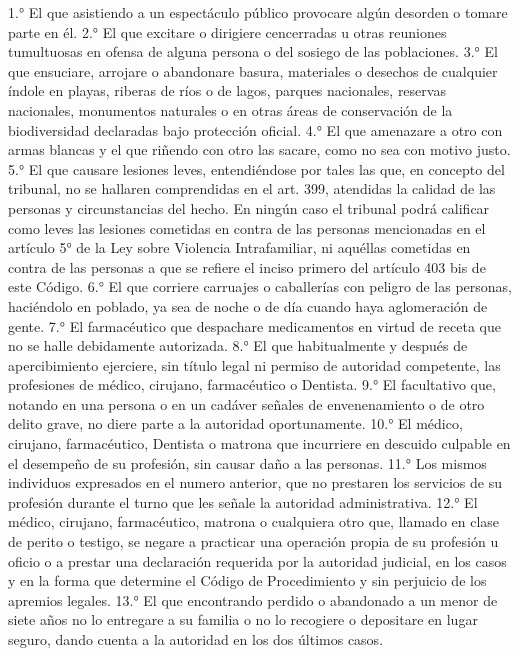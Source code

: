     1.° El que asistiendo a un espectáculo público provocare algún desorden o tomare parte en él.
    2.° El que excitare o dirigiere cencerradas u otras reuniones tumultuosas en ofensa de alguna persona o del sosiego de las poblaciones.
    3.° El que ensuciare, arrojare o abandonare basura, materiales o desechos de cualquier índole en playas, riberas de ríos o de lagos, parques nacionales, reservas nacionales, monumentos naturales o en otras áreas de conservación de la biodiversidad declaradas bajo protección oficial.
    4.° El que amenazare a otro con armas blancas y el que riñendo con otro las sacare, como no sea con motivo justo.
    5.° El que causare lesiones leves, entendiéndose por tales las que, en concepto del tribunal, no se hallaren comprendidas en el art. 399, atendidas la calidad de las personas y circunstancias del hecho. En ningún caso el tribunal podrá calificar como leves las lesiones cometidas en contra de las personas mencionadas en el artículo 5° de la Ley sobre Violencia Intrafamiliar, ni aquéllas cometidas en contra de las personas a que se refiere el inciso primero del artículo 403 bis de este Código.
    6.° El que corriere carruajes o caballerías con peligro de las personas, haciéndolo en poblado, ya sea de noche o de día cuando haya aglomeración de gente.
    7.° El farmacéutico que despachare medicamentos en virtud de receta que no se halle debidamente autorizada.
    8.° El que habitualmente y después de apercibimiento ejerciere, sin título legal ni permiso de autoridad competente, las profesiones de médico, cirujano, farmacéutico o Dentista.
    9.° El facultativo que, notando en una persona o en un cadáver señales de envenenamiento o de otro delito grave, no diere parte a la autoridad oportunamente.
    10.° El médico, cirujano, farmacéutico, Dentista o matrona que incurriere en descuido culpable en el desempeño de su profesión, sin causar daño a las personas.
    11.° Los mismos individuos expresados en el numero anterior, que no prestaren los servicios de su profesión durante el turno que les señale la autoridad administrativa.
    12.° El médico, cirujano, farmacéutico, matrona o cualquiera otro que, llamado en clase de perito o testigo, se negare a practicar una operación propia de su profesión u oficio o a prestar una declaración requerida por la autoridad judicial, en los casos y en la forma que determine el Código de Procedimiento y sin perjuicio de los apremios legales.
    13.° El que encontrando perdido o abandonado a un menor de siete años no lo entregare a su familia o no lo recogiere o depositare en lugar seguro, dando cuenta a la autoridad en los dos últimos casos.
